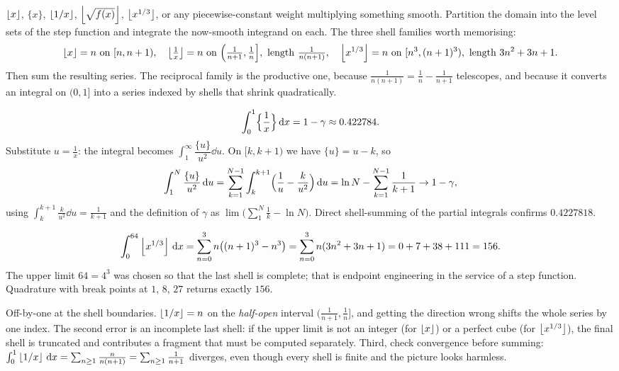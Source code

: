 \cue $\left\lfloor x\right\rfloor$, $\{x\}$, $\left\lfloor 1/x\right\rfloor$, $\left\lfloor \sqrt{f(x)}\right\rfloor$, $\left\lfloor x^{1/3}\right\rfloor$, or any piecewise-constant weight multiplying something smooth.
\method Partition the domain into the level sets of the step function and integrate the now-smooth integrand on each. The three shell families worth memorising:
\[\floorb{x}=n\ \text{on}\ [n,n+1),\quad \floorb{\tfrac1x}=n\ \text{on}\ \Bigl(\tfrac{1}{n+1},\tfrac1n\Bigr],\ \text{length}\ \tfrac{1}{n(n+1)},\quad \floorb{x^{1/3}}=n\ \text{on}\ [n^{3},(n+1)^{3}),\ \text{length}\ 3n^{2}+3n+1.\]
Then sum the resulting series. The reciprocal family is the productive one, because $\tfrac{1}{n(n+1)}=\tfrac1n-\tfrac{1}{n+1}$ telescopes, and because it converts an integral on $(0,1]$ into a series indexed by shells that shrink quadratically.

\begin{worked}
\[\int_0^{1}\Bigl\{\frac1x\Bigr\}\,\mathrm{d} x=1-\gamma\approx0.422784.\]
Substitute $u=\tfrac1x$: the integral becomes $\int_1^{\infty}\dfrac{\{u\}}{u^{2}}\dd u$. On $[k,k+1)$ we have $\{u\}=u-k$, so
\[\int_1^{N}\frac{\{u\}}{u^{2}}\,\mathrm{d} u=\sum_{k=1}^{N-1}\int_k^{k+1}\Bigl(\frac1u-\frac{k}{u^{2}}\Bigr)\,\mathrm{d} u=\ln N-\sum_{k=1}^{N-1}\frac{1}{k+1}\to1-\gamma,\]
using $\int_k^{k+1}\tfrac{k}{u^{2}}\dd u=\tfrac{1}{k+1}$ and the definition of $\gamma$ as $\lim\bigl(\sum_{1}^{N}\tfrac1k-\ln N\bigr)$. Direct shell-summing of the partial integrals confirms $0.4227818$.
\end{worked}

\begin{worked}
\[\int_0^{64}\left\lfloor x^{1/3}\right\rfloor\,\mathrm{d} x=\sum_{n=0}^{3}n\bigl((n+1)^{3}-n^{3}\bigr)=\sum_{n=0}^{3}n(3n^{2}+3n+1)=0+7+38+111=156.\]
The upper limit $64=4^{3}$ was chosen so that the last shell is complete; that is endpoint engineering in the service of a step function. Quadrature with break points at $1$, $8$, $27$ returns exactly $156$.
\end{worked}

\begin{trap}
Off-by-one at the shell boundaries. $\left\lfloor 1/x\right\rfloor=n$ on the \emph{half-open} interval $\bigl(\tfrac{1}{n+1},\tfrac1n\bigr]$, and getting the direction wrong shifts the whole series by one index. The second error is an incomplete last shell: if the upper limit is not an integer (for $\left\lfloor x\right\rfloor$) or a perfect cube (for $\left\lfloor x^{1/3}\right\rfloor$), the final shell is truncated and contributes a fragment that must be computed separately. Third, check convergence before summing: $\int_0^{1}\left\lfloor 1/x\right\rfloor\,\mathrm{d} x=\sum_{n\geq1}\tfrac{n}{n(n+1)}=\sum_{n\geq1}\tfrac{1}{n+1}$ diverges, even though every shell is finite and the picture looks harmless.
\end{trap}

